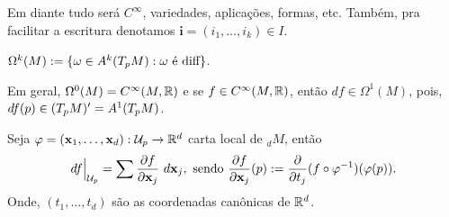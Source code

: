 
\begin{note}
    Em diante tudo será \(C^\infty\), variedades, aplicações, formas, etc. Também, pra facilitar a escritura denotamos \(\textbf{i} = (i_1, \ldots, i_k) \in I\). 
\end{note}

\begin{definition}
    \centering \(\Omega^k(M):= \{ \omega\in A^k(T_pM)  :  \omega \text{ é diff}\}\).  
\end{definition}

\newcommand{\cuna}{\text{\small $\bigwedge$ }}

\begin{note}
    Em geral, \(\Omega^0(M)=C^\infty(M,\mathbb{R})\) e se \(f \in C^\infty(M, \mathbb{R})\), então \(df \in \Omega^1(M)\), pois, \(df(p)\in (T_pM)' = A^1(T_pM)\).    
\end{note}

\begin{exercise}
    Seja \(\varphi = (\textbf{x}_1, \ldots, \textbf{x}_d) : \mathcal{U}_p \to \mathbb{R}^d\) carta local de \(_dM\), então 
    \[df\Big|_{{\mathcal{U}_p}} = \sum \frac{\partial f }{\partial \textbf{x}_j} \ d\textbf{x}_j, \ \text{sendo }  \frac{\partial f }{\partial \textbf{x}_j}(p) := \frac{\partial }{\partial t_j} (f\circ \varphi^{-1})(\varphi(p)).\]
    Onde, \((t_1, \ldots, t_d)\) são as coordenadas canônicas de \(\mathbb{R}^d\).  
\end{exercise}

